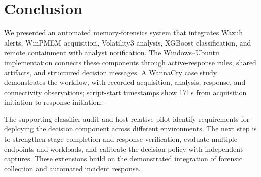\documentclass[conference]{IEEEtran}
\begin{document}
\section{Conclusion}

We presented an automated memory-forensics system that integrates Wazuh alerts,
WinPMEM acquisition, Volatility3 analysis, XGBoost classification, and remote
containment with analyst notification. The Windows--Ubuntu implementation
connects these components through active-response rules, shared artifacts,
and structured decision messages. A WannaCry case study demonstrates the
workflow, with recorded acquisition, analysis, response, and connectivity
observations; script-start timestamps show 171\,s from acquisition initiation
to response initiation.

The supporting classifier audit and host-relative pilot identify requirements
for deploying the decision component across different environments. The next
step is to strengthen stage-completion and response verification, evaluate
multiple endpoints and workloads, and calibrate the decision policy with
independent captures. These extensions build on the demonstrated integration
of forensic collection and automated incident response.
\end{document}
